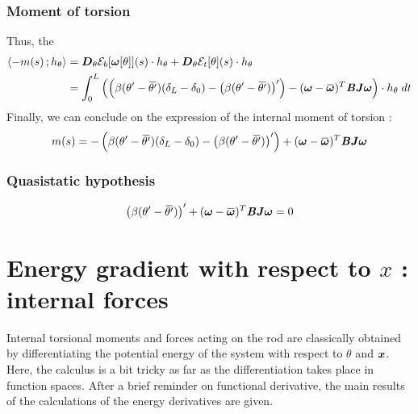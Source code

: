 \subsubsection{Moment of torsion}
Thus, the
\begin{equation}
	\begin{aligned}
		\scalar{-m(s)}{h_\theta} &= \pdiffof{\theta}{\mathcal{E}_b[\vect{\omega}[\theta]]}{s}{h_\theta} + \pdiffof{\theta}{\mathcal{E}_t[\theta]}{s}{h_\theta} \\
		&= \int_{0}^{L} \left(\left(\beta(\theta' -{\overbar{\theta'}})(\delta_L-\delta_0) - \left(\beta(\theta' -{\overbar{\theta'}})\right)'\right) - (\vect{\omega} - \overbar{\vect{\omega}})^T \mat{B} \mat{J}\vect{\omega}\right) \cdot h_\theta \;dt
	\end{aligned}
\end{equation}
Finally, we can conclude on the expression of the internal moment of torsion :
\begin{equation}
	m(s) = - \left(\beta(\theta' -{\overbar{\theta'}})(\delta_L-\delta_0) - \left(\beta(\theta' -{\overbar{\theta'}})\right)'\right) + (\vect{\omega} - \overbar{\vect{\omega}})^T \mat{B} \mat{J}\vect{\omega}
\end{equation}

\subsubsection{Quasistatic hypothesis}
\begin{equation}
	\left(\beta(\theta' -{\overbar{\theta'}})\right)' + (\vect{\omega} - \overbar{\vect{\omega}})^T \mat{B} \mat{J}\vect{\omega} = 0
\end{equation}





\section{Energy gradient with respect to $x$ : internal forces}

Internal torsional moments and forces acting on the rod are classically obtained by differentiating the potential energy of the system with respect to $\theta$ and $\boldsymbol{x}$. Here, the calculus is a bit tricky as far as the differentiation takes place in function spaces. After a brief reminder on functional derivative, the main results of the calculations of the energy derivatives are given.

